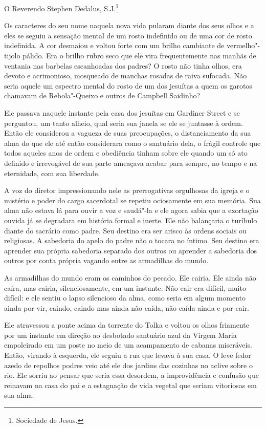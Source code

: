 O Reverendo Stephen Dedalus, S.J.\footnote{ Sociedade de Jesus.}

Os caracteres do seu nome naquela nova vida pularam diante dos seus
olhos e a eles se seguiu a sensação mental de um rosto indefinido ou de
uma cor de rosto indefinida. A cor desmaiou e voltou forte com um
brilho cambiante de vermelho"-tijolo pálido. Era o brilho rubro seco que
ele vira frequentemente nas manhãs de ventania nas barbelas escanhoadas
dos padres? O rosto não tinha olhos, era devoto e acrimonioso,
mosqueado de manchas rosadas de raiva sufocada. Não seria
aquele um espectro mental do rosto de um dos jesuítas a quem os garotos
chamavam de Rebola"-Queixo e outros de Campbell Saidinho?

Ele passava naquele instante pela casa dos jesuítas em Gardiner Street e
se perguntou, um tanto alheio, qual seria sua janela se ele se juntasse
à ordem. Então ele considerou a vagueza de suas preocupações, o
distanciamento da sua alma do que ele até então considerara como o
santuário dela, o frágil controle que todos aqueles anos de ordem e
obediência tinham sobre ele quando um só ato definido e irrevogável de
sua parte ameaçava acabar para sempre, no tempo e na eternidade, com
sua liberdade.

A voz do diretor impressionando nele as prerrogativas orgulhosas da
igreja e o mistério e poder do cargo sacerdotal se repetiu ociosamente
em sua memória. Sua alma não estava lá para ouvir a voz e saudá"-la e
ele agora sabia que a exortação ouvida já se degradara em história
formal e inerte. Ele não balançaria o turíbulo diante do sacrário como
padre. Seu destino era ser arisco às ordens sociais ou religiosas. A
sabedoria do apelo do padre não o tocara no íntimo. Seu destino era
aprender sua própria sabedoria separado dos outros ou aprender a
sabedoria dos outros por conta própria vagando entre as armadilhas do
mundo.

As armadilhas do mundo eram os caminhos do pecado. Ele cairia. Ele ainda
não caíra, mas cairia, silenciosamente, em um instante. Não cair era
difícil, muito difícil: e ele sentiu o lapso silencioso da alma, como
seria em algum momento ainda por vir, caindo, caindo mas ainda não
caída, não caída ainda e por cair.

Ele atravessou a ponte acima da torrente do Tolka e voltou os olhos
friamente por um instante em direção ao desbotado santuário azul da
Virgem Maria empoleirado em um poste no meio de um acampamento de
cabanas miseráveis. Então, virando à esquerda, ele seguiu a rua que
levava à sua casa. O leve fedor azedo de repolhos podres veio até ele
dos jardins das cozinhas no aclive sobre o rio. Ele sorriu ao pensar
que seria essa desordem, a improvidência e confusão que reinavam na
casa do pai e a estagnação de vida vegetal que seriam vitoriosas em sua
alma.

